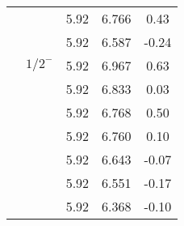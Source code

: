 \documentclass[prd,twocolumn,floatfix,nofootinbib]{revtex4}
\begin{document}
\begin{table*}[!htbp]
\begin{tabular}{ccccc}
            &               &5.92   &6.766  &0.43 \\
            &               &5.92   &6.587  &-0.24 \\
            &${1/2}^{-}$    &5.92   &6.967  &0.63 \\
            &               &5.92   &6.833  &0.03 \\
            &               &5.92   &6.768  &0.50 \\
            &               &5.92   &6.760  &0.10 \\
            &               &5.92   &6.643  &-0.07 \\
            &               &5.92   &6.551  &-0.17 \\
            &               &5.92   &6.368  &-0.10 \\  
        \hline\hline
    \end{tabular}
\end{table*}
\end{document}
